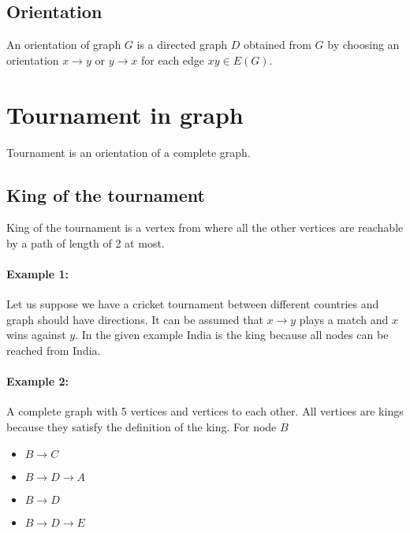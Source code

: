 \subsection{Orientation}

An orientation of graph $G$ is a directed graph $D$ obtained from $G$ by choosing an orientation $ x \to y$ or $y \to x$ for each edge $xy \in E(G) $. 

 
 
\section{Tournament in graph}

Tournament is an orientation of a complete graph. 

\subsection{King of the tournament}
King of the tournament is a vertex from where all the other vertices are reachable by a path of length of 2 at most.

\paragraph{Example 1:}Let us suppose we have a cricket tournament between different countries and graph should have directions. It can be assumed that $x \to y$ plays a match and $x$ wins against $y$. In the given example India is the king because all nodes can be reached from India.

\paragraph{Example 2:}A complete graph with 5 vertices and vertices to each other. All vertices are kings because they satisfy the definition of the king.
For node $B$
\begin{itemize}
    \item $B \to C$
    \item $B \to D \to A$
    \item $B \to D $
    \item $B \to D \to E$
    \end{itemize}

